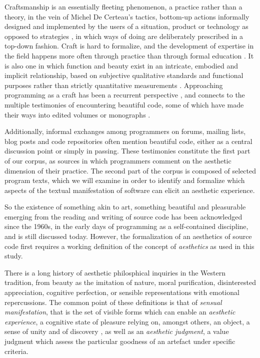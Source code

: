 Craftsmanship is an essentially fleeting phenomenon, a practice rather than a theory, in the vein of Michel De Certeau's tactics, bottom-up actions informally designed and implemented by the users of a situation, product or technology as opposed to strategies \citep{certeau_invention_1990}, in which ways of doing are deliberately prescribed in a top-down fashion. Craft is hard to formalize, and the development of expertise in the field happens more often through practice than through formal education \citep{sennett_craftsman_2009}. It is also one in which function and beauty exist in an intricate, embodied and implicit relationship, based on subjective qualitative standards and functional purposes rather than strictly quantitative measurements \citep{pye_nature_2008}. Approaching programming as a craft has been a recurrent perspective \citep{levy_programmation_1992,dijkstra_craftsman_1982}, and connects to the multiple testimonies of encountering beautiful code, some of which have made their ways into edited volumes or monographs \citep{oram_beautiful_2007,chandra_geek_2014,gabriel_patterns_1998}.

Additionally, informal exchanges among programmers on forums, mailing lists, blog posts and code repositories often mention beautiful code, either as a central discussion point or simply in passing. These testimonies constitute the first part of our corpus, as sources in which programmers comment on the aesthetic dimension of their practice. The second part of the corpus is composed of selected program texts, which we will examine in order to identify and formalize which aspects of the textual manifestation of software can elicit an aesthetic experience.

So the existence of something akin to art, something beautiful and pleasurable emerging from the reading and writing of source code has been acknowledged since the 1960s, in the early days of programming as a self-contained discipline, and is still discussed today. However, the formalization of an aesthetics of source code first requires a working definition of the concept of \emph{aesthetics} as used in this study.

There is a long history of aesthetic philosphical inquiries in the Western tradition, from beauty as the imitation of nature, moral purification, disinterested appreciation, cognitive perfection, or sensible representations with emotional repercussions. The common point of these definitions is that of \emph{sensual manifestation}, that is the set of visible forms which can enable an \emph{aesthetic experience}, a cognitive state of pleasure relying on, amongst others, an object, a sense of unity and of discovery \citep{beardsley_aesthetic_1970}, as well as an \emph{aesthetic judgment}, a value judgment which assess the particular goodness of an artefact under specific criteria.

